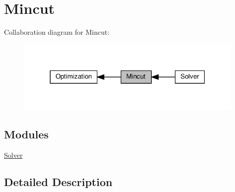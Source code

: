 \hypertarget{group__group__mincut}{}\section{Mincut}
\label{group__group__mincut}
Collaboration diagram for Mincut\+:
\nopagebreak
\begin{figure}[H]
\begin{center}
\leavevmode
\includegraphics[width=313pt]{group__group__mincut}
\end{center}
\end{figure}
\subsection*{Modules}
\begin{DoxyCompactItemize}
\item 
\hyperlink{group__group__mincut__solver}{Solver}
\end{DoxyCompactItemize}


\subsection{Detailed Description}
